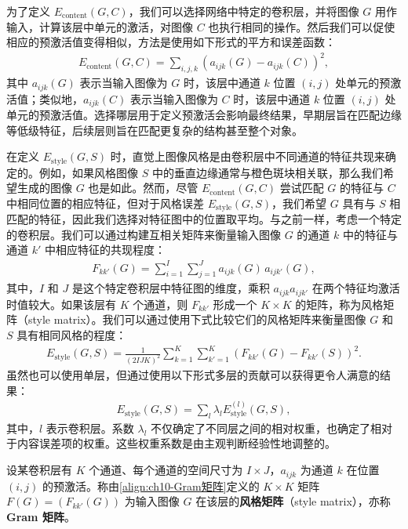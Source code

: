 \documentclass[../../main.tex]{subfiles}
\begin{document}
为了定义 $E_{\mathrm{content}}(G,C)$，我们可以选择网络中特定的卷积层，并将图像 $G$ 用作输入，计算该层中单元的激活，对图像 $C$ 也执行相同的操作。然后我们可以促使相应的预激活值变得相似，方法是使用如下形式的平方和误差函数：
\begin{align}
  E_{\mathrm{content}}(G,C)=\sum_{i,j,k}\left(a_{ijk}(G)-a_{ijk}(C)\right)^2,
  \label{align:ch10-内容误差}
\end{align}
其中 $a_{ijk}(G)$ 表示当输入图像为 $G$ 时，该层中通道 $k$ 位置 $(i,j)$ 处单元的预激活值；类似地，$a_{ijk}(C)$ 表示当输入图像为 $C$ 时，该层中通道 $k$ 位置 $(i,j)$ 处单元的预激活值。选择哪层用于定义预激活会影响最终结果，早期层旨在匹配边缘等低级特征，后续层则旨在匹配更复杂的结构甚至整个对象。

在定义 $E_{\mathrm{style}}(G,S)$ 时，直觉上图像风格是由卷积层中不同通道的特征共现来确定的。例如，如果风格图像 $S$ 中的垂直边缘通常与橙色斑块相关联，那么我们希望生成的图像 $G$ 也是如此。然而，尽管 $E_{\mathrm{content}}(G,C)$ 尝试匹配 $G$ 的特征与 $C$ 中相同位置的相应特征，但对于风格误差 $E_{\mathrm{style}}(G,S)$，我们希望 $G$ 具有与 $S$ 相匹配的特征，因此我们选择对特征图中的位置取平均。与之前一样，考虑一个特定的卷积层。我们可以通过构建互相关矩阵来衡量输入图像 $G$ 的通道 $k$ 中的特征与通道 $k'$ 中相应特征的共现程度：
\begin{align}
  F_{kk'}(G)=\sum_{i=1}^{I}\sum_{j=1}^{J}a_{ijk}(G)\,a_{ijk'}(G),
  \label{align:ch10-Gram矩阵}
\end{align}
其中，$I$ 和 $J$ 是这个特定卷积层中特征图的维度，乘积 $a_{ijk}a_{ijk'}$ 在两个特征均激活时值较大。如果该层有 $K$ 个通道，则 $F_{kk'}$ 形成一个 $K\times K$ 的矩阵，称为风格矩阵（style matrix）。我们可以通过使用下式比较它们的风格矩阵来衡量图像 $G$ 和 $S$ 具有相同风格的程度：
\begin{align}
  E_{\mathrm{style}}(G,S)=\frac{1}{(2IJK)^2}\sum_{k=1}^{K}\sum_{k'=1}^{K}\left(F_{kk'}(G)-F_{kk'}(S)\right)^2.
  \label{align:ch10-风格误差}
\end{align}
虽然也可以使用单层，但通过使用以下形式多层的贡献可以获得更令人满意的结果：
\begin{align}
  E_{\mathrm{style}}(G,S)=\sum_{l}\lambda_l E_{\mathrm{style}}^{(l)}(G,S),
  \label{align:ch10-多层风格误差}
\end{align}
其中，$l$ 表示卷积层。系数 $\lambda_l$ 不仅确定了不同层之间的相对权重，也确定了相对于内容误差项的权重。这些权重系数是由主观判断经验性地调整的。

\begin{definition}\label{definition:ch10-Gram矩阵}
设某卷积层有 $K$ 个通道、每个通道的空间尺寸为 $I\times J$，$a_{ijk}$ 为通道 $k$ 在位置 $(i,j)$ 的预激活。称由\eqref{align:ch10-Gram矩阵}定义的 $K\times K$ 矩阵 $F(G)=(F_{kk'}(G))$ 为输入图像 $G$ 在该层的\textbf{风格矩阵}（style matrix），亦称 \textbf{Gram 矩阵}。
\end{definition}
\end{document}
